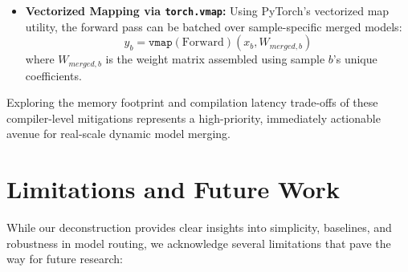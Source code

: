 \begin{itemize}
\begin{itemize}
        Nonetheless, we must explicitly emphasize that Triton-based dynamic weight assembly remains an active engineering frontier with non-trivial implementation challenges on modern GPU memory hierarchies. Although LoRA parameterization ($\gamma \ll 1$) dramatically reduces the physical parameter footprint, loading $K$ separate sets of LoRA weights into SRAM at runtime still requires highly synchronized, coalesced memory transfers. On modern GPU architectures (e.g., NVIDIA H100 or A100), coordinating the concurrent read of $K$ distinct LoRA matrices from High Bandwidth Memory (HBM) introduces significant synchronization stalls and warp scheduling overheads. If the HBM-to-SRAM bandwidth is saturated, these memory synchronization bottlenecks can quickly erase any theoretical latency gains. Therefore, implementing efficient tensor layout alignments, managing warp synchronization, and compiling low-overhead custom Triton kernels that interleave weight interpolation directly with matrix-multiplication operations are crucial, open engineering problems that must be solved to realize the full performance of dynamic weight assembly on commercial GPU hardware.
    \end{itemize} This enables true batch-independent routing.
    \item \textbf{Vectorized Mapping via \texttt{torch.vmap}:} Using PyTorch's vectorized map utility, the forward pass can be batched over sample-specific merged models:
    \begin{equation}
        y_b = \mathtt{vmap}\left(\text{Forward}\right)\left(x_b, W_{merged, b}\right)
    \end{equation}
    where $W_{merged, b}$ is the weight matrix assembled using sample $b$'s unique coefficients.
\end{itemize}
Exploring the memory footprint and compilation latency trade-offs of these compiler-level mitigations represents a high-priority, immediately actionable avenue for real-scale dynamic model merging.

\section{Limitations and Future Work}
\label{sec:limitations_app}
While our deconstruction provides clear insights into simplicity, baselines, and robustness in model routing, we acknowledge several limitations that pave the way for future research:

